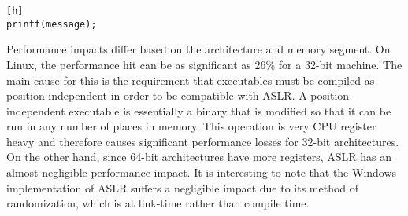 \begin{lstlisting}[caption=A dangerous printf statement][h]
printf(message);
\end{lstlisting}


Performance impacts differ based on the architecture and memory segment. On Linux, the performance hit can be as significant as 26\% for a 32-bit machine. \cite{payer2012too} The main cause for this is the requirement that executables must be compiled as position-independent in order to be compatible with ASLR. A position-independent executable is essentially a binary that is modified so that it can be run in any number of places in memory. This operation is very CPU register heavy and therefore causes significant performance losses for 32-bit architectures. On the other hand, since 64-bit architectures have more registers, ASLR has an almost negligible performance impact. It is interesting to note that the Windows implementation of ASLR suffers a negligible impact due to its method of randomization, which is at link-time rather than compile time.
